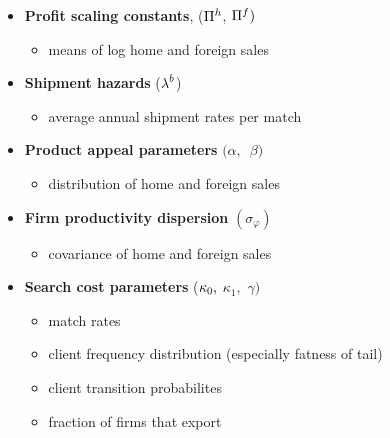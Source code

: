 \documentclass[notes=show]{beamer}
\begin{document}
\begin{frame}%



\begin{itemize}
\item \textbf{Profit scaling constants}, (${\small \Pi }^{h}$, ${\small \Pi }%
^{f})$

\begin{itemize}
\item means of log home and foreign sales
\end{itemize}

\item \textbf{Shipment hazards} (${\small \lambda }^{b}$)

\begin{itemize}
\item average annual shipment rates per match
\end{itemize}

\item \textbf{Product appeal parameters} $(\alpha ,$\ $\beta )$

\begin{itemize}
\item distribution of home and foreign sales
\end{itemize}

\item \textbf{Firm productivity dispersion} $(\sigma _{\varphi })$

\begin{itemize}
\item covariance of home and foreign sales
\end{itemize}

\item \textbf{Search cost parameters} (${\small \kappa }_{0}{\small ,}$ $%
\kappa _{1},$ $\gamma )$

\begin{itemize}
\item match rates

\item client frequency distribution (especially fatness of tail)

\item client transition probabilites

\item fraction of firms that export
\end{itemize}
\end{itemize}

\end{frame}%
\end{document}

